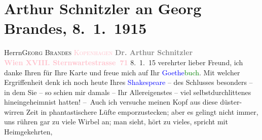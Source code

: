 

               \section[Arthur Schnitzler an Georg Brandes, 8. 1. 1915]{ Arthur Schnitzler an Georg Brandes, 8. 1. 1915}\nopagebreak{}\rehead{ }\normalsize\beginnumbering{} \toendnotes[C]{\smallbreak\pagebreak[2]} 
\toendnotes[C]{\smallbreak}\pstart{}{\pb}Herrn\pend{}\pstart{}\textsc{Georg Brandes}\pend{}\pstart{}\textcolor{pink}{\textsc{ Kopenhagen }}{}\ledrightnote{\textcolor{pink}{Kopenhagen}}\pend{}{\bigskip}\pstart
           \noindent{}{\pb}\textcolor{gray}{\textbf{Dr. Arthur Schnitzler}}{\\}\textcolor{gray}{\textbf{\textcolor{pink}{Wien XVIII. Sternwartestrasse 71}{}\ledrightnote{\textcolor{pink}{Sternwartestraße}}}}\pend
           \pstart
           \raggedleft{}8. 1. 15\pend
           \pstart
           verehrter lieber Freund, ich danke Ihren für Ihre Karte und
                    freue mich auf Ihr \textcolor{green}{\textcolor{blue}{Goethe}{}\ledrightnote{\textcolor{blue}{Johann Wolfgang von Goethe}}buch}{}. Mit welcher
                    Ergriffenheit denk ich noch heute Ihres \textcolor{green}{\textcolor{blue}{Shakespeare}{}\ledrightnote{\textcolor{blue}{William Shakespeare}}}{} – des Schlusses besonders – in dem Sie – so schien mir damals – Ihr
                    Allereigenstes – viel selbstdurchlittenes hineingeheimnist hatten!\pend
           \pstart
           – Auch ich versuche meinen Kopf aus diese düster-wirren Zeit in phantastischere
                    Lüfte emporzustecken; aber es gelingt nicht immer, uns rühren gar zu viele
                    Wirbel an; man sieht, hört zu vieles, spricht mit Heimgekehrten,
